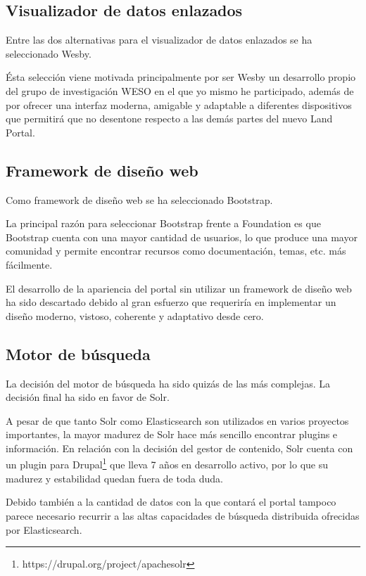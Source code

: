 \subsection{Visualizador de datos enlazados}
Entre las dos alternativas para el visualizador de datos enlazados se ha seleccionado Wesby.

Ésta selección viene motivada principalmente por ser Wesby un desarrollo propio del grupo de investigación WESO en el que yo mismo he participado, además de por ofrecer una interfaz moderna, amigable y adaptable a diferentes dispositivos que permitirá que no desentone respecto a las demás partes del nuevo Land Portal.


\subsection{Framework de diseño web}
Como framework de diseño web se ha seleccionado Bootstrap.

La principal razón para seleccionar Bootstrap frente a Foundation es que Bootstrap cuenta con una mayor cantidad de usuarios, lo que produce una mayor comunidad y permite encontrar recursos como documentación, temas, etc. más fácilmente.

El desarrollo de la apariencia del portal sin utilizar un framework de diseño web ha sido descartado debido al gran esfuerzo que requeriría en implementar un diseño moderno, vistoso, coherente y adaptativo desde cero.


\subsection{Motor de búsqueda}
La decisión del motor de búsqueda ha sido quizás de las más complejas. La decisión final ha sido en favor de Solr.

A pesar de que tanto Solr como Elasticsearch son utilizados en varios proyectos importantes, la mayor madurez de Solr hace más sencillo encontrar plugins e información.  En relación con la decisión del gestor de contenido, Solr cuenta con un plugin para Drupal\footnote{https://drupal.org/project/apachesolr} que lleva 7 años en desarrollo activo, por lo que su madurez y estabilidad quedan fuera de toda duda.

Debido también a la cantidad de datos con la que contará el portal tampoco parece necesario recurrir a las altas capacidades de búsqueda distribuida ofrecidas por Elasticsearch.


